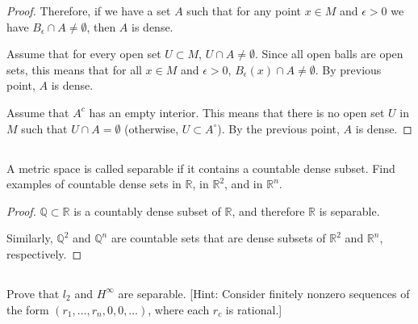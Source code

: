 \begin{proof}
Therefore, if we have a set $A$ such that for any point $x \in M$ and $\epsilon > 0$ we have $B_\epsilon \cap A \neq \emptyset$, then $A$ is dense.

\vspace{1em}

Assume that for every open set $U \subset M$, $U \cap A \neq \emptyset$. Since all open balls are open sets, this means that for all $x \in M$ and $\epsilon > 0$, $B_\epsilon(x) \cap A \neq \emptyset$. By previous point, $A$ is dense.

\vspace{1em}

Assume that $A^c$ has an empty interior. This means that there is no open set $U$ in $M$ such that $U \cap A = \emptyset$ (otherwise, $U\subset A^\circ$). By the previous point, $A$ is dense.


\end{proof}




\subsection{} A metric space is called separable if it contains a countable dense subset. Find examples of countable dense sets in $\mathbb{R}$, in $\mathbb{R}^2$, and in $\mathbb{R}^n$. 

\begin{proof}
$\mathbb{Q} \subset \mathbb{R}$ is a countably dense subset of $\mathbb{R}$, and therefore $\mathbb{R}$ is separable.

Similarly, $\mathbb{Q}^2$ and $\mathbb{Q}^n$ are countable sets that are dense subsets of $\mathbb{R}^2$ and $\mathbb{R}^n$, respectively.

\end{proof}

\subsection{} Prove that $l_2$ and $H^\infty$ are separable. [Hint: Consider finitely nonzero sequences of the form $(r_1, \dots , r_n, 0, 0, \dots)$, where each $r_c$ is rational.] 


